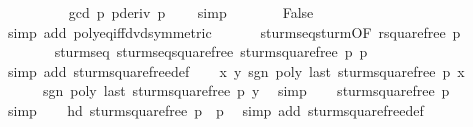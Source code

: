 \begin{isabellebody}
\ \ \ \ \ \ \ \ \isamarkupfalse%
\ {\isachardoublequoteopen}gcd\ p{\isacharprime}\ {\isacharparenleft}pderiv\ p{\isacharprime}{\isacharparenright}\ {\isacharequal}\ {}{\isachardoublequoteclose}\ \isamarkupfalse%
\ simp\isanewline
\ \ \ \ \isamarkupfalse%
\ \isamarkupfalse%
\ False\ \isamarkupfalse%
\ {\isacharparenleft}simp\ add{\isacharcolon}\ poly{\isacharunderscore}eq{\isacharunderscore}{}{\isacharunderscore}iff{\isacharunderscore}dvd{\isacharbrackleft}symmetric{\isacharbrackright}{\isacharparenright}\isanewline
\ \ \isamarkupfalse%
\isanewline
\isanewline
\ \ \isamarkupfalse%
\ sturm{\isacharunderscore}seq{\isacharunderscore}sturm{\isacharbrackleft}OF\ {\isacharbackquoteopen}rsquarefree\ p{\isacharprime}{\isacharbackquoteclose}{\isacharbrackright}\ \isanewline
\ \ \ \ \ \ \isamarkupfalse%
\ sturm{\isacharunderscore}seq{\isacharcolon}\ sturm{\isacharunderscore}seq{\isacharunderscore}squarefree\ {\isachardoublequoteopen}sturm{\isacharunderscore}squarefree\ p{\isachardoublequoteclose}\ p{\isacharprime}\ \isanewline
\ \ \ \ \ \ \isamarkupfalse%
\ {\isacharparenleft}simp\ add{\isacharcolon}\ sturm{\isacharunderscore}squarefree{\isacharunderscore}def{\isacharparenright}\isanewline
\isanewline
\ \ \isamarkupfalse%
\ {\isachardoublequoteopen}{\isasymAnd}x\ y{\isachardot}\ sgn\ {\isacharparenleft}poly\ {\isacharparenleft}last\ {\isacharparenleft}sturm{\isacharunderscore}squarefree\ p{\isacharparenright}{\isacharparenright}\ x{\isacharparenright}\ {\isacharequal}\ \isanewline
\ \ \ \ \ \ sgn\ {\isacharparenleft}poly\ {\isacharparenleft}last\ {\isacharparenleft}sturm{\isacharunderscore}squarefree\ p{\isacharparenright}{\isacharparenright}\ y{\isacharparenright}{\isachardoublequoteclose}\ \isamarkupfalse%
\ simp\isanewline
\ \ \isamarkupfalse%
\ {\isachardoublequoteopen}sturm{\isacharunderscore}squarefree\ p\ {\isasymnoteq}\ {\isacharbrackleft}{\isacharbrackright}{\isachardoublequoteclose}\ \isamarkupfalse%
\ simp\isanewline
\ \ \isamarkupfalse%
\ {\isachardoublequoteopen}hd\ {\isacharparenleft}sturm{\isacharunderscore}squarefree\ p{\isacharparenright}\ {\isacharequal}\ p{\isacharprime}{\isachardoublequoteclose}\ \isamarkupfalse%
\ {\isacharparenleft}simp\ add{\isacharcolon}\ sturm{\isacharunderscore}squarefree{\isacharunderscore}def{\isacharparenright}\isanewline
\ \ \isamarkupfalse%

\end{isabellebody}
